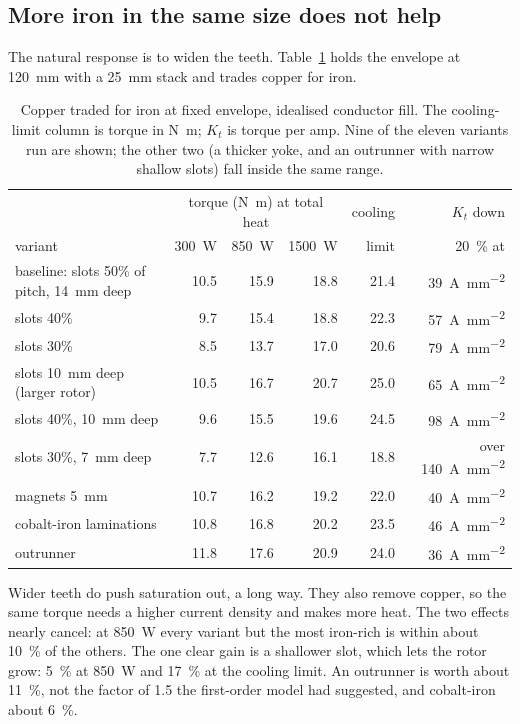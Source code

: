 \documentclass[11pt]{article}
\newcommand{\Amm}{\si{A\per\milli\metre\squared}}
\newcommand{\Nm}{\si{N.m}}
\begin{document}
\subsection{More iron in the same size does not help}

The natural response is to widen the teeth. Table~\ref{tab:variants} holds the
envelope at \diameter\SI{120}{mm} with a \SI{25}{mm} stack and trades copper
for iron.

\begin{table}[h]
\centering
\small
\begin{tabular}{lrrrrr}
\toprule
 & \multicolumn{3}{c}{torque (\si{\Nm}) at total heat} & cooling & $K_t$ down\\
variant & \SI{300}{W} & \SI{850}{W} & \SI{1500}{W} & limit & \SI{20}{\percent} at\\
\midrule
baseline: slots 50\% of pitch, \SI{14}{mm} deep & 10.5 & 15.9 & 18.8 & 21.4 & \SI{39}{\Amm}\\
slots 40\% & 9.7 & 15.4 & 18.8 & 22.3 & \SI{57}{\Amm}\\
slots 30\% & 8.5 & 13.7 & 17.0 & 20.6 & \SI{79}{\Amm}\\
slots \SI{10}{mm} deep (larger rotor) & 10.5 & 16.7 & 20.7 & 25.0 & \SI{65}{\Amm}\\
slots 40\%, \SI{10}{mm} deep & 9.6 & 15.5 & 19.6 & 24.5 & \SI{98}{\Amm}\\
slots 30\%, \SI{7}{mm} deep & 7.7 & 12.6 & 16.1 & 18.8 & over \SI{140}{\Amm}\\
magnets \SI{5}{mm} & 10.7 & 16.2 & 19.2 & 22.0 & \SI{40}{\Amm}\\
cobalt-iron laminations & 10.8 & 16.8 & 20.2 & 23.5 & \SI{46}{\Amm}\\
outrunner & 11.8 & 17.6 & 20.9 & 24.0 & \SI{36}{\Amm}\\
\bottomrule
\end{tabular}
\caption{Copper traded for iron at fixed envelope, idealised conductor fill.
The cooling-limit column is torque in \si{\Nm}; $K_t$ is torque per amp.
Nine of the eleven variants run are shown; the other two (a thicker yoke, and
an outrunner with narrow shallow slots) fall inside the same range.}
\label{tab:variants}
\end{table}

Wider teeth do push saturation out, a long way. They also remove copper, so
the same torque needs a higher current density and makes more heat. The two
effects nearly cancel: at \SI{850}{W} every variant but the most iron-rich is
within about \SI{10}{\percent} of the others. The one clear gain is a
shallower slot, which lets the rotor grow: \SI{+5}{\percent} at \SI{850}{W}
and \SI{+17}{\percent} at the cooling limit. An outrunner is worth about
\SI{11}{\percent}, not the factor of 1.5 the first-order model had suggested,
and cobalt-iron about \SI{6}{\percent}.
\end{document}
